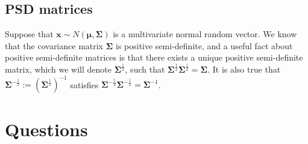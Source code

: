 \documentclass[11pt]{article}
\begin{document}
\subsection*{PSD matrices}

Suppose that $\mathbf{x} \sim N(\boldsymbol{\mu}, \boldsymbol{\Sigma})$ is a multivariate normal random vector. We know that the covariance matrix $\boldsymbol{\Sigma}$ is positive semi-definite, and a useful fact about positive semi-definite matrices is that there exists a unique positive semi-definite matrix, which we will denote $\boldsymbol{\Sigma}^{\frac{1}{2}}$, such that $\boldsymbol{\Sigma}^{\frac{1}{2}}\boldsymbol{\Sigma}^{\frac{1}{2}} = \boldsymbol{\Sigma}$. It is also true that $\boldsymbol{\Sigma}^{-\frac{1}{2}} := (\boldsymbol{\Sigma}^{\frac{1}{2}})^{-1}$ satisfies $\boldsymbol{\Sigma}^{-\frac{1}{2}}\boldsymbol{\Sigma}^{-\frac{1}{2}} = \boldsymbol{\Sigma}^{-1}$.

\newpage

\section*{Questions}
\end{document}
